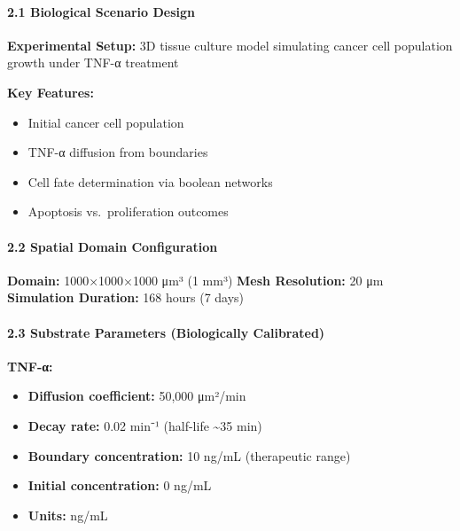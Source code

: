 \hypertarget{biological-scenario-design}{%
\paragraph{2.1 Biological Scenario
Design}\label{biological-scenario-design}}

\textbf{Experimental Setup:} 3D tissue culture model simulating cancer
cell population growth under TNF-α treatment

\textbf{Key Features:}

\begin{itemize}
\tightlist
\item
  Initial cancer cell population
\item
  TNF-α diffusion from boundaries
\item
  Cell fate determination via boolean networks
\item
  Apoptosis vs.~proliferation outcomes
\end{itemize}

\hypertarget{spatial-domain-configuration}{%
\paragraph{2.2 Spatial Domain
Configuration}\label{spatial-domain-configuration}}

\textbf{Domain:} 1000×1000×1000 μm³ (1 mm³) \textbf{Mesh Resolution:} 20
μm \textbf{Simulation Duration:} 168 hours (7 days)

\hypertarget{substrate-parameters-biologically-calibrated}{%
\paragraph{2.3 Substrate Parameters (Biologically
Calibrated)}\label{substrate-parameters-biologically-calibrated}}

\textbf{TNF-α:}

\begin{itemize}
\tightlist
\item
  \textbf{Diffusion coefficient:} 50,000 μm²/min
\item
  \textbf{Decay rate:} 0.02 min⁻¹ (half-life \textasciitilde35 min)
\item
  \textbf{Boundary concentration:} 10 ng/mL (therapeutic range)
\item
  \textbf{Initial concentration:} 0 ng/mL
\item
  \textbf{Units:} ng/mL
\end{itemize}

